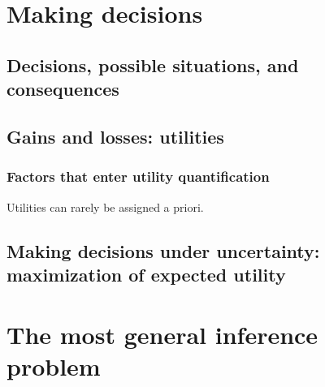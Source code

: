 \documentclass[
  letterpaper,
  DIV=11,
  numbers=noendperiod,
  oneside]{scrreprt}
\begin{document}

\hypertarget{making-decisions}{%
\chapter{Making decisions}\label{making-decisions}}

\hypertarget{decisions-possible-situations-and-consequences}{%
\section{Decisions, possible situations, and
consequences}\label{decisions-possible-situations-and-consequences}}

\hypertarget{gains-and-losses-utilities}{%
\section{Gains and losses: utilities}\label{gains-and-losses-utilities}}

\hypertarget{factors-that-enter-utility-quantification}{%
\subsection{Factors that enter utility
quantification}\label{factors-that-enter-utility-quantification}}

Utilities can rarely be assigned a priori.

\hypertarget{making-decisions-under-uncertainty-maximization-of-expected-utility}{%
\section{Making decisions under uncertainty: maximization of expected
utility}\label{making-decisions-under-uncertainty-maximization-of-expected-utility}}


\hypertarget{the-most-general-inference-problem}{%
\chapter{The most general inference
problem}\label{the-most-general-inference-problem}}
\end{document}
